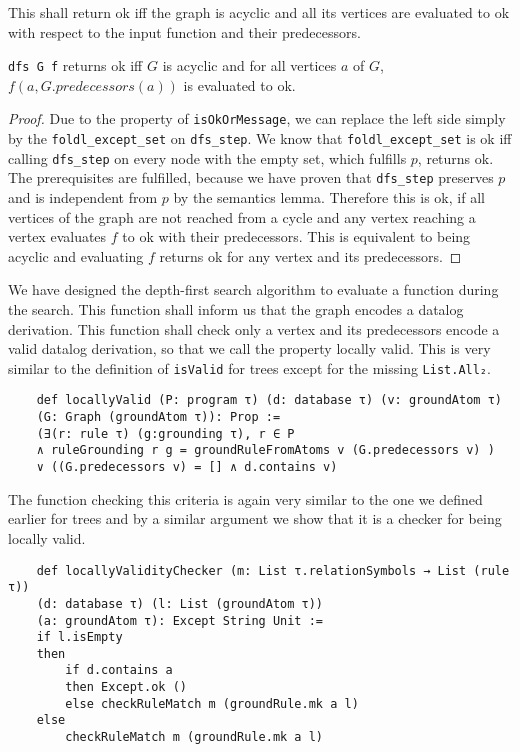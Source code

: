 This shall return ok iff the graph is acyclic and all its vertices are evaluated to ok with respect to the input function and their predecessors.

\begin{lemma}
    \texttt{dfs G f} returns ok iff $G$ is acyclic and for all vertices $a$ of $G$, $f(a, G.predecessors(a))$ is evaluated to ok.
\end{lemma}
\begin{proof}
    Due to the property of \texttt{isOkOrMessage}, we can replace the left side simply by the \texttt{foldl\_except\_set} on \texttt{dfs\_step}. We know that \texttt{foldl\_except\_set} is ok iff calling \texttt{dfs\_step} on every node with the empty set, which fulfills $p$, returns ok. The prerequisites are fulfilled, because we have proven that \texttt{dfs\_step} preserves $p$ and is independent from $p$ by the semantics lemma. Therefore this is ok, if all vertices of the graph are not reached from a cycle and any vertex reaching a vertex evaluates $f$ to ok with their predecessors. This is equivalent to being acyclic and evaluating $f$ returns ok for any vertex and its predecessors.
\end{proof}

We have designed the depth-first search algorithm to evaluate a function during the search. This function shall inform us that the graph encodes a datalog derivation. This function shall check only a vertex and its predecessors encode a valid datalog derivation, so that we call the property locally valid. This is very similar to the definition of \texttt{isValid} for trees except for the missing \texttt{List.All₂}.

\begin{lstlisting}
    def locallyValid (P: program τ) (d: database τ) (v: groundAtom τ) 
    (G: Graph (groundAtom τ)): Prop :=
    (∃(r: rule τ) (g:grounding τ), r ∈ P 
    ∧ ruleGrounding r g = groundRuleFromAtoms v (G.predecessors v) ) 
    ∨ ((G.predecessors v) = [] ∧ d.contains v)
\end{lstlisting}

The function checking this criteria is again very similar to the one we defined earlier for trees and by a similar argument we show that it is a checker for being locally valid.

\begin{lstlisting}
    def locallyValidityChecker (m: List τ.relationSymbols → List (rule τ))
    (d: database τ) (l: List (groundAtom τ))
    (a: groundAtom τ): Except String Unit :=
    if l.isEmpty
    then
        if d.contains a
        then Except.ok ()
        else checkRuleMatch m (groundRule.mk a l) 
    else
        checkRuleMatch m (groundRule.mk a l)
\end{lstlisting}


